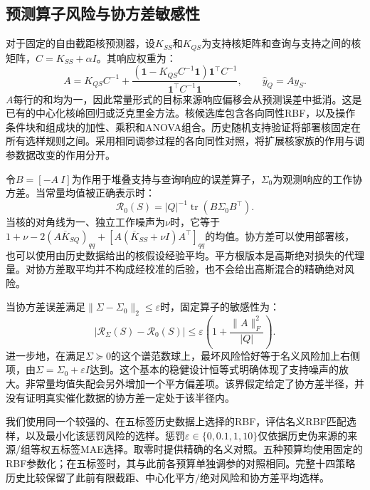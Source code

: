 \documentclass[11pt]{article}
\begin{document}
\subsection{预测算子风险与协方差敏感性}
对于固定的自由截距核预测器，设$K_{SS}$和$K_{QS}$为支持核矩阵和查询与支持之间的核矩阵，$C=K_{SS}+\alpha I$。其响应权重为：
\begin{equation}\label{eq:weights}
A=K_{QS}C^{-1}+
\frac{(\mathbf1-K_{QS}C^{-1}\mathbf1)\mathbf1^\top C^{-1}}
{\mathbf1^\top C^{-1}\mathbf1},\qquad \widehat y_Q=Ay_S.
\end{equation}
$A$每行的和均为一，因此常量形式的目标来源响应偏移会从预测误差中抵消。这是已有的中心化核岭回归或泛克里金方法\cite{gpml}。核候选库包含各向同性RBF，以及操作条件块和组成块的加性、乘积和ANOVA组合。历史随机支持验证将部署核固定在所有选样规则之间。采用相同调参过程的各向同性对照，将扩展核家族的作用与调参数据改变的作用分开。

令$B=[-A\ I]$为作用于堆叠支持与查询响应的误差算子，$\Sigma_0$为观测响应的工作协方差。当常量均值被正确表示时：
\begin{equation}\label{eq:risk}
\mathcal R_0(S)=|Q|^{-1}\operatorname{tr}(B\Sigma_0B^\top).
\end{equation}
当核的对角线为一、独立工作噪声为$\nu$时，它等于$1+\nu-2(A\overline K_{SQ})_{qq}+[A(\overline K_{SS}+\nu I)A^\top]_{qq}$的均值。协方差可以使用部署核，也可以使用由历史数据给出的核假设经验平均。平方根版本是高斯绝对损失的代理量。对协方差取平均并不构成经校准的后验，也不会给出高斯混合的精确绝对风险。

当协方差误差满足$\|\Sigma-\Sigma_0\|_2\leq\varepsilon$时，固定算子的敏感性为：
\begin{equation}\label{eq:bound}
|\mathcal R_\Sigma(S)-\mathcal R_0(S)|\leq
\varepsilon\left(1+\frac{\|A\|_F^2}{|Q|}\right).
\end{equation}
进一步地，在满足$\Sigma\succeq0$的这个谱范数球上，最坏风险恰好等于名义风险加上右侧项，由$\Sigma=\Sigma_0+\varepsilon I$达到。这个基本的稳健设计恒等式明确体现了支持噪声的放大。非常量均值失配会另外增加一个平方偏差项。该界假定给定了协方差半径，并没有证明真实催化数据的协方差一定处于该半径内。

我们使用同一个较强的、在五标签历史数据上选择的RBF，评估名义RBF匹配选样，以及最小化该惩罚风险的选样。惩罚$\varepsilon\in\{0,0.1,1,10\}$仅依据历史伪来源的来源/组等权五标签MAE选择。取零时提供精确的名义对照。五种预算均使用固定的RBF参数化；在五标签时，其与此前各预算单独调参的对照相同。完整十四策略历史比较保留了此前有限截距、中心化平方/绝对风险和协方差平均选样。
\end{document}
